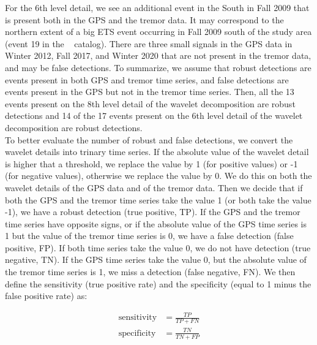 \documentclass{article}
\begin{document}
For the 6th level detail, we see an additional event in the South in Fall 2009 that is present both in the GPS and the tremor data. It may correspond to the northern extent of a big ETS event occurring in Fall 2009 south of the study area (event 19 in the ~\citet{MIC_2019} catalog). There are three small signals in the GPS data in Winter 2012, Fall 2017, and Winter 2020 that are not present in the tremor data, and may be false detections. To summarize, we assume that robust detections are events present in both GPS and tremor time series, and false detections are events present in the GPS but not in the tremor time series. Then, all the 13 events present on the 8th level detail of the wavelet decomposition are robust detections and 14 of the 17 events present on the 6th level detail of the wavelet decomposition are robust detections. \\

To better evaluate the number of robust and false detections, we convert the wavelet details into trinary time series. If the absolute value of the wavelet detail is higher that a threshold, we replace the value by 1 (for positive values) or -1 (for negative values), otherwise we replace the value by 0. We do this on both the wavelet details of the GPS data and of the tremor data. Then we decide that if both the GPS and the tremor time series take the value 1 (or both take the value -1), we have a robust detection (true positive, TP). If the GPS and the tremor time series have opposite signs, or if the absolute value of the GPS time series is 1 but the value of the tremor time series is 0, we have a false detection (false positive, FP). If both time series take the value 0, we do not have detection (true negative, TN). If the GPS time series take the value 0, but the absolute value of the tremor time series is 1, we miss a detection (false negative, FN). We then define the sensitivity (true positive rate) and the specificity (equal to 1 minus the false positive rate) as:

\begin{equation}
\begin{aligned}
\text{sensitivity} &= \frac{TP}{TP + FN} \\
\text{specificity} &= \frac{TN} {TN + FP}
\end{aligned}
\end{equation}
\end{document}
